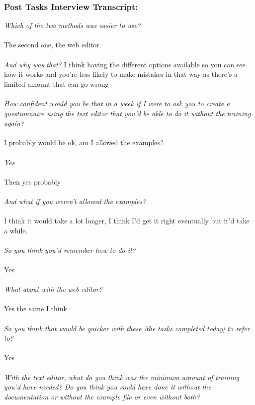 \documentclass{report}
\begin{document}
\subsubsection*{Post Tasks Interview Transcript:}
\textit{Which of the two methods was easier to use?}
\\
\\
The second one, the web editor
\\
\\
\textit{And why was that?}
I think having the different options available so you can see how it works and you're less likely to make mistakes in that way as there's a limited amount that can go wrong
\\
\\
\textit{How confident would you be that in a week if I were to ask you to create a questionnaire using the text editor that you'd be able to do it without the training again?}
\\
\\
I probably would be ok, am I allowed the examples?
\\
\\
\textit{Yes}
\\
\\
Then yes probably
\\
\\
\textit{And what if you weren't allowed the examples?}
\\
\\
I think it would take a lot longer, I think I'd get it right eventually but it'd take a while.
\\
\\
\textit{So you think you'd remember how to do it?}
\\
\\
Yes
\\
\\
\textit{What about with the web editor?}
\\
\\
Yes the same I think
\\
\\
\textit{So you think that would be quicker with these [the tasks completed today] to refer to? }
\\
\\
Yes
\\
\\
\textit{With the text editor, what do you think was the minimum amount of training you'd have needed?  Do you think you could have done it without the documentation or without the example file or even without both?}
\end{document}
